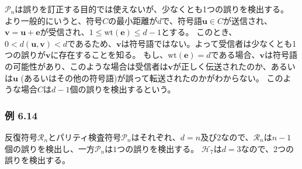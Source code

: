 \documentclass[12pt,a4paper]{article}
\begin{document}
$\mathcal{P}_n$は誤りを訂正する目的では使えないが、少なくとも1つの誤りを検出する。
より一般的にいうと、符号$C$の最小距離が$d$で、符号語$\mathbf{u} \in C$が送信され、$\mathbf{v} = \mathbf{u} + \mathbf{e}$が受信され、$1 \leq \text{wt}(\mathbf{e}) \leq d - 1$とする。
このとき、$0 < d ( \mathbf{u}, \mathbf{v}) < d$であるため、$\mathbf{v}$は符号語ではない。よって受信者は少なくとも1つの誤りが$\mathbf{v}$に存在することを知る。
もし、$\text{wt}(\mathbf{e}) = d$である場合、$\mathbf{v}$は符号語の可能性があり、このような場合は受信者は$\mathbf{v}$が正しく伝送されたのか、あるいは$\mathbf{u}$ (あるいはその他の符号語)が誤って転送されたのかがわからない。
このような場合$C$は$d-1$個の誤りを検出するという。

\subsubsection*{例 6.14}

反復符号$\mathcal{R}_n$とパリティ検査符号$\mathcal{P}_n$はそれぞれ、$d = n$及び$2$なので、$\mathcal{R}_n$は$n-1$個の誤りを検出し、一方$\mathcal{P}_n$は$1$つの誤りを検出する。
$\mathcal{H}_7$は$d=3$なので、2つの誤りを検出する。
\end{document}
